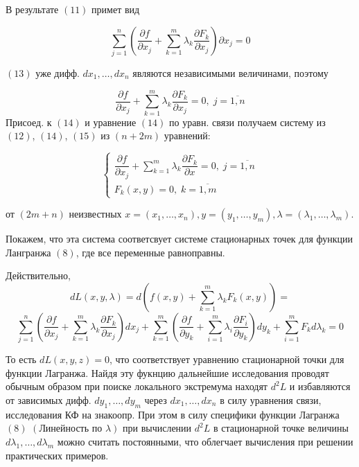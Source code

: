\documentclass[../../main.tex]{subfiles}
\begin{document}
	
	В результате $\left( 11 \right)$ %
	примет вид
	
	\begin{equation}
	\label{QQQQQQQQQQQQQQQQQQQQQQQQQQQQQQQQQQkek_label_2}
	\sum\limits_{j=1}^{n}\left(  \dfrac{\partial f }{\partial x_j} + 
	\sum\limits_{k=1}^{m} \lambda_k\dfrac{\partial F_k }{\partial x_j}  
	\right) \partial x_j =0 
	\end{equation}
	
	$\left( 13 \right) $ %
	уже дифф. %
	$d x_1,\ldots,d x_n$ являются независимыми величинами, поэтому
	
	\[\dfrac{\partial f }{\partial x_j} + \sum\limits_{k=1}^{m}
	\lambda_k \dfrac{\partial F_k }{\partial x_j} = 0,\; j = \overline{1, n}
	\]
	Присоед. к $\left( 14 \right) $ и уравнение $\left( 14 \right) $ по 
	уравн. связи получаем \smallskip систему из $\left( 12 \right) $, 
	$\left( 14 \right) $,
	$\left( 15 \right) $ из $ \left( n + 2m \right) $ уравнений:
	
	\begin{equation}
	\begin{cases}
	\dfrac{\partial f }{\partial x_j} + \sum\limits_{k=1}^{m}
	\lambda_k \dfrac{\partial F_k }{\partial x} = 0,\; j = \overline{1, n}\\
	F_k\left( x, y \right) = 0,\; k = \overline{1, m}
	\end{cases}
	\end{equation}
	
	от $ \left( 2m + n \right) $ неизвестных $x = \left( x_1, \ldots, x_n \right),
	y = \left( y_1, \ldots, y_m \right), \lambda = \left( \lambda_1,
	\ldots, \lambda_m \right) $.
	
	Покажем, что эта система соответсвует системе стационарных точек для
	функции Лангранжа $\left( 8 \right) $, где все переменные равноправны.
	
	Действительно, 
	\[dL\left( x, y, \lambda \right) = d\left( f\left( x, y\right) 
	+ \sum\limits_{k=1}^{m}\lambda_k F_k\left( x, y \right) \right) =\]
	\[
	\sum\limits_{j=1}^{n}\left( \dfrac{\partial f}{\partial x_j} 
	+ \sum\limits_{k=1}^{m}\lambda_k \dfrac{\partial F_k}{\partial x_j}  
	\right)d x_j + \sum\limits_{k=1}^{m} \left( \dfrac{\partial f}{\partial y_k} 
	+ \sum\limits_{i=1}^{m}\lambda_i \dfrac{\partial F_i}{\partial y_k}  \right)
	d 	y_k + \sum\limits_{i=1}^{m} F_k d \lambda_k = 0\]
	
	То есть $dL\left( x, y, z \right) = 0$, что соответствует уравнению 
	стационарной точки для функции Лагранжа. Найдя эту фукнцию дальнейшие
	исследования проводят обычным образом при поиске локального экстремума 
	находят $d^2L$ и избавляются от зависимых дифф. $d y_1, \ldots, d y_m $ 
	через $d x_1, \ldots, d x_n$ в силу уравнения связи, исследования КФ на 
	знакоопр. При этом в силу специфики функции Лагранжа $\left( 8 \right)$ 
	$\left( \text{Линейность по } \lambda \right) $ при вычислении $d^2 L$
	в стационарной точке величины $d \lambda_1, \ldots, d \lambda_m$ можно
	считать постоянными, что облегчает вычисления при решении практических
	примеров.
	
\end{document}

